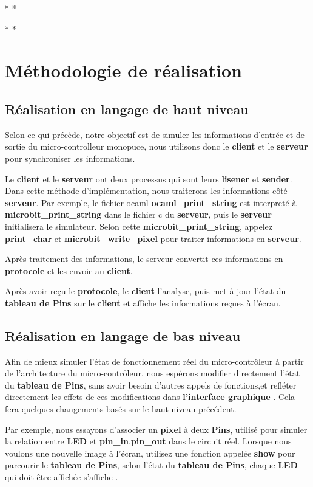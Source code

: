 \documentclass[14px]{article}
\begin{document}
  * *

  * *
\section{Méthodologie de réalisation}
\subsection{Réalisation en langage de haut niveau}
Selon ce qui précède, notre objectif est de simuler les informations d'entrée et de sortie du micro-controlleur monopuce, nous utilisons donc le \textbf{client} et le \textbf{serveur} pour synchroniser les informations.

Le \textbf{client} et le \textbf{serveur} ont deux processus qui sont leurs \textbf{lisener} et \textbf{sender}. Dans cette méthode d'implémentation, nous traiterons les informations côté \textbf{serveur}. Par exemple, le fichier ocaml \textbf{ocaml\_print\_string} est interpreté à \textbf{microbit\_print\_string} dans le fichier c du \textbf{serveur}, puis le \textbf{serveur} initialisera le simulateur. Selon cette \textbf{microbit\_print\_string}, appelez \textbf{print\_char} et \textbf{microbit\_write\_pixel} pour traiter informations en \textbf{serveur}.

Après traitement des informations, le serveur convertit ces informations en \textbf{protocole} et les envoie au \textbf{client}.

Après avoir reçu le \textbf{protocole}, le  \textbf{client} l'analyse, puis met à jour l'état du \textbf{tableau de Pins} sur le \textbf{client} et affiche les informations reçues à l'écran.

\subsection{Réalisation en langage de bas niveau}
Afin de mieux simuler l'état de fonctionnement réel du micro-contrôleur à partir de l'architecture du micro-contrôleur, nous espérons modifier directement l'état du \textbf{tableau de Pins}, sans avoir besoin d'autres appels de fonctions,et refléter directement les effets de ces modifications dans \textbf{l'interface graphique} . Cela fera quelques changements basés sur le haut niveau précédent.

Par exemple, nous essayons d'associer un \textbf{pixel} à deux \textbf{Pins}, utilisé pour simuler la relation entre \textbf{LED} et \textbf{pin\_in},\textbf{pin\_out} dans le circuit réel. Lorsque nous voulons une nouvelle image à l'écran, utilisez une fonction appelée \textbf{show} pour parcourir le \textbf{tableau de Pins}, selon l'état du \textbf{tableau de Pins}, chaque \textbf{LED} qui doit être affichée s'affiche .
\end{document}
